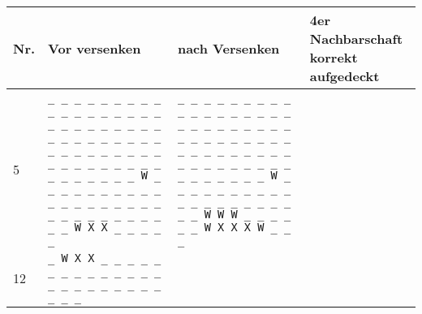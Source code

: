 \begin{longtable}{|m{}|p{}|p{}|m{}|}
		\hline
		Nr.	&	Vor versenken							&	nach Versenken							&	4er Nachbarschaft \newline korrekt aufgedeckt	\\
		\hline
		\hline
		5	& \texttt{\_  \_  \_  \_  \_  \_  \_  \_  \_  \_\newline
				\_  \_  \_  \_  \_  \_  \_  \_  \_  \_\newline
				\_  \_  \_  \_  \_  \_  \_  \_  \_  \_\newline
				\_  \_  \_  \_  \_  \_  \_  \_  \_  \_\newline
				\_  \_  \_  \_  \_  \_  \_  \_  \_  \_\newline
				\_  \_  \_  \_  \_  \_  \_  \_  \_  \_\newline
				\_  W  \_  \_  \_  \_  \_  \_  \_  \_\newline
				\_  \_  \_  \_  \_  \_  \_  \_  \_  \_\newline
				\_  \_  \_  \_  \_  \_  \_  \_  \_  \_\newline
				\_  \_  W  X  X  \_  \_  \_  \_  \_\newline
				}										&	\texttt{\_  \_  \_  \_  \_  \_  \_  \_  \_  \_\newline
															\_  \_  \_  \_  \_  \_  \_  \_  \_  \_\newline
															\_  \_  \_  \_  \_  \_  \_  \_  \_  \_\newline
															\_  \_  \_  \_  \_  \_  \_  \_  \_  \_\newline
															\_  \_  \_  \_  \_  \_  \_  \_  \_  \_\newline
															\_  \_  \_  \_  \_  \_  \_  \_  \_  \_\newline
															\_  W  \_  \_  \_  \_  \_  \_  \_  \_\newline
															\_  \_  \_  \_  \_  \_  \_  \_  \_  \_\newline
															\_  \_  \_  W  W  W  \_  \_  \_  \_\newline
															\_  \_  W  X  X  X  W  \_  \_  \_\newline	
															}										& \checkmark \\ \hline
		12	&	\texttt{\_  W  X  X  \_  \_  \_  \_  \_  \_\newline
				\_  \_  \_  \_  \_  \_  \_  \_  \_  \_\newline
				\_  \_  \_  \_  \_  \_  \_  \_  \_  \_\newline
}
\end{longtable}

